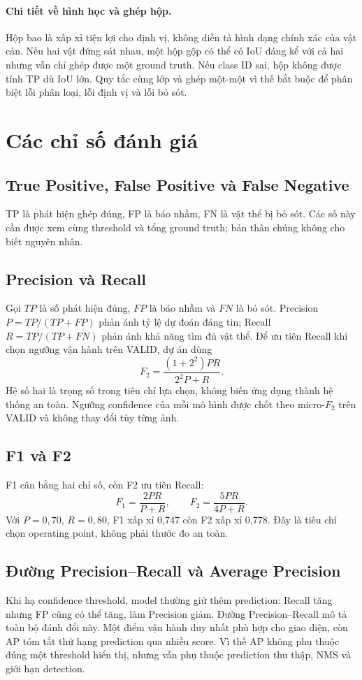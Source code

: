 \documentclass[12pt,a4paper,oneside]{report}
\begin{document}
\paragraph{Chi tiết về hình học và ghép hộp.}
Hộp bao là xấp xỉ tiện lợi cho định vị, không diễn tả hình dạng chính xác của vật cản. Nếu hai vật đứng sát nhau, một hộp gộp có thể có IoU đáng kể với cả hai nhưng vẫn chỉ ghép được một ground truth. Nếu class ID sai, hộp không được tính TP dù IoU lớn. Quy tắc cùng lớp và ghép một-một vì thế bắt buộc để phân biệt lỗi phân loại, lỗi định vị và lỗi bỏ sót.

\section{Các chỉ số đánh giá}
\subsection{True Positive, False Positive và False Negative}
TP là phát hiện ghép đúng, FP là báo nhầm, FN là vật thể bị bỏ sót. Các số này cần được xem cùng threshold và tổng ground truth; bản thân chúng không cho biết nguyên nhân.
\subsection{Precision và Recall}
Gọi $TP$ là số phát hiện đúng, $FP$ là báo nhầm và $FN$ là bỏ sót. Precision $P=TP/(TP+FP)$ phản ánh tỷ lệ dự đoán đáng tin; Recall $R=TP/(TP+FN)$ phản ánh khả năng tìm đủ vật thể. Để ưu tiên Recall khi chọn ngưỡng vận hành trên VALID, dự án dùng
\begin{equation}F_2=\frac{(1+2^2)PR}{2^2P+R}.\end{equation}
Hệ số hai là trọng số trong tiêu chí lựa chọn, không biến ứng dụng thành hệ thống an toàn. Ngưỡng confidence của mỗi mô hình được chốt theo micro-$F_2$ trên VALID và không thay đổi tùy từng ảnh. 


\subsection{F1 và F2} F1 cân bằng hai chỉ số, còn F2 ưu tiên Recall:
\begin{equation}F_1=\frac{2PR}{P+R},\qquad F_2=\frac{5PR}{4P+R}.\end{equation}
Với $P=0,70$, $R=0,80$, F1 xấp xỉ 0,747 còn F2 xấp xỉ 0,778. Đây là tiêu chí chọn operating point, không phải thước đo an toàn.
\subsection{Đường Precision--Recall và Average Precision}
Khi hạ confidence threshold, model thường giữ thêm prediction: Recall tăng nhưng FP cũng có thể tăng, làm Precision giảm. Đường Precision--Recall mô tả toàn bộ đánh đổi này. Một điểm vận hành duy nhất phù hợp cho giao diện, còn AP tóm tắt thứ hạng prediction qua nhiều score. Vì thế AP không phụ thuộc đúng một threshold hiển thị, nhưng vẫn phụ thuộc prediction thu thập, NMS và giới hạn detection.
\end{document}
